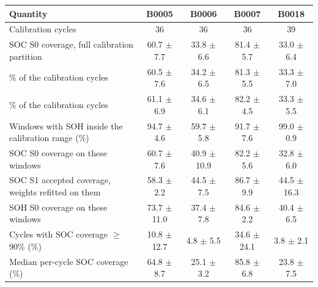 \begin{tabular}{lcccc}
\toprule
Quantity & B0005 & B0006 & B0007 & B0018 \\
\midrule
Calibration cycles & 36 & 36 & 36 & 39 \\
SOC S0 coverage, full calibration partition & 60.7 $\pm$ 7.7 & 33.8 $\pm$ 6.6 & 81.4 $\pm$ 5.7 & 33.0 $\pm$ 6.4 \\
\quad 50\% of the calibration cycles & 60.5 $\pm$ 7.6 & 34.2 $\pm$ 6.5 & 81.3 $\pm$ 5.5 & 33.3 $\pm$ 7.0 \\
\quad 25\% of the calibration cycles & 61.1 $\pm$ 6.9 & 34.6 $\pm$ 6.1 & 82.2 $\pm$ 4.5 & 33.3 $\pm$ 5.5 \\
Windows with SOH inside the calibration range (\%) & 94.7 $\pm$ 4.6 & 59.7 $\pm$ 5.8 & 91.7 $\pm$ 7.6 & 99.0 $\pm$ 0.9 \\
\quad SOC S0 coverage on these windows & 60.7 $\pm$ 7.6 & 40.9 $\pm$ 10.9 & 82.2 $\pm$ 5.6 & 32.8 $\pm$ 6.0 \\
\quad SOC S1 accepted coverage, weights refitted on them & 58.3 $\pm$ 2.2 & 44.5 $\pm$ 7.5 & 86.7 $\pm$ 9.9 & 44.5 $\pm$ 16.3 \\
\quad SOH S0 coverage on these windows & 73.7 $\pm$ 11.0 & 37.4 $\pm$ 7.8 & 84.6 $\pm$ 2.2 & 40.4 $\pm$ 6.5 \\
Cycles with SOC coverage $\geq$ 90\% (\%) & 10.8 $\pm$ 12.7 & 4.8 $\pm$ 5.5 & 34.6 $\pm$ 24.1 & 3.8 $\pm$ 2.1 \\
Median per-cycle SOC coverage (\%) & 64.8 $\pm$ 8.7 & 25.1 $\pm$ 3.2 & 85.8 $\pm$ 6.8 & 23.8 $\pm$ 7.5 \\
\bottomrule
\end{tabular}
